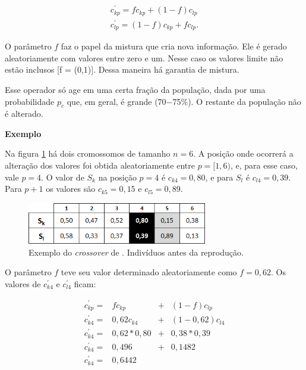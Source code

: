 	\begin{equation}
		\begin{array}{l}
			c^{'}_{kp} = f c_{kp} + (1 - f) c_{lp}     \\
			c^{'}_{lp} = (1 - f) c_{kp} + f c_{lp}.
		\end{array}
	\end{equation}
	
	O parâmetro $f$ faz o papel da mistura que cria nova informação. Ele é gerado aleatoriamente com valores entre zero e um. Nesse caso os valores limite não estão inclusos [f = (0,1)]. Dessa maneira há garantia de mistura.
	
	Esse operador só age em uma certa fração da população, dada por uma probabilidade $p_c$ que, em geral, é grande (70$-$75\%). O restante da população não é alterado.

\textbf{Exemplo}

Na figura \ref{fig:cross2004_tabelaAntes} há dois cromossomos de tamanho $n = 6$. A posição onde ocorrerá a alteração dos valores foi obtida aleatoriamente entre $p = [1,6)$, e, para esse caso, vale $p = 4$. O valor de $S_k$ na posição $p = 4$ é $c_{k4} = 0,80$, e para $S_l$ é $c_{l4} = 0,39$. Para $p + 1$ os valores são $c_{k5} = 0,15$ e $c_{l5} = 0,89$.

\begin{figure}[htbp]
	\centering
		\includegraphics[width=0.70\textwidth]{figs/materiais_metodo/autovalores_com_ga/cross2004_tabelaAntes.png}
	\caption{Exemplo do \emph{crossover} de \cite{metodo2004}. Indivíduos antes da reprodução.}
	\label{fig:cross2004_tabelaAntes}
\end{figure}

O parâmetro $f$ teve seu valor determinado aleatoriamente como $f = 0,62$. Os valores de $c^{'}_{k4}$ e $c^{'}_{l4}$ ficam:

\begin{equation}\label{eq:ck4}
	\begin{array}{lccl}
		c^{'}_{kp} = & f c_{kp} & + & (1 - f) c_{lp} 						\\
		c^{'}_{k4} = & 0,62 c_{k4} & + & (1 - 0,62) c_{l4} 			\\
		c^{'}_{k4} = & 0,62 * 0,80 & + & 0,38 * 0,39 						\\		
		c^{'}_{k4} = & 0,496 & + & 0,1482	\\		
		c^{'}_{k4} = & 0,6442 &  & 
	\end{array}
\end{equation}

